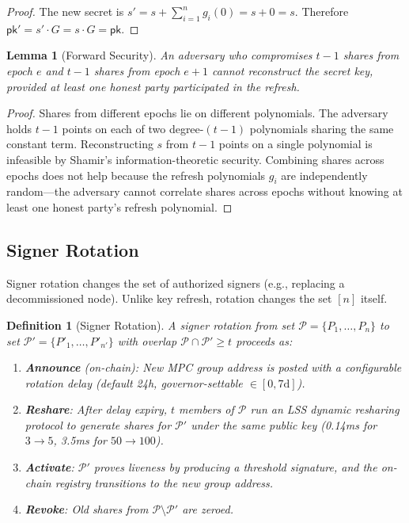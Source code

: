 \documentclass[11pt,twocolumn]{article}
\newtheorem{lemma}[theorem]{Lemma}
\newtheorem{definition}{Definition}[section]
\begin{document}
\begin{proof}
The new secret is $s' = s + \sum_{i=1}^n g_i(0) = s + 0 = s$. Therefore
$\mathsf{pk}' = s' \cdot G = s \cdot G = \mathsf{pk}$.
\end{proof}

\begin{lemma}[Forward Security]
\label{lem:forward-sec}
An adversary who compromises $t-1$ shares from epoch $e$ and $t-1$ shares from
epoch $e+1$ cannot reconstruct the secret key, provided at least one honest party
participated in the refresh.
\end{lemma}

\begin{proof}
Shares from different epochs lie on different polynomials. The adversary holds
$t-1$ points on each of two degree-$(t-1)$ polynomials sharing the same constant
term. Reconstructing $s$ from $t-1$ points on a single polynomial is infeasible
by Shamir's information-theoretic security. Combining shares across epochs does not
help because the refresh polynomials $g_i$ are independently random---the adversary
cannot correlate shares across epochs without knowing at least one honest party's
refresh polynomial.
\end{proof}

\subsection{Signer Rotation}
\label{sec:rotation}

Signer rotation changes the set of authorized signers (e.g., replacing a
decommissioned node). Unlike key refresh, rotation changes the set $[n]$ itself.

\begin{definition}[Signer Rotation]
A signer rotation from set $\mathcal{P} = \{P_1, \ldots, P_n\}$ to set
$\mathcal{P}' = \{P'_1, \ldots, P'_{n'}\}$ with overlap
$\mathcal{P} \cap \mathcal{P}' \geq t$ proceeds as:
\begin{enumerate}[nosep]
  \item \textbf{Announce} (on-chain): New MPC group address is posted with a
    configurable rotation delay (default 24h, governor-settable $\in [0, 7\text{d}]$).
  \item \textbf{Reshare}: After delay expiry, $t$ members of $\mathcal{P}$ run an LSS
    dynamic resharing protocol to generate shares for $\mathcal{P}'$ under the same
    public key (0.14ms for $3 \to 5$, 3.5ms for $50 \to 100$).
  \item \textbf{Activate}: $\mathcal{P}'$ proves liveness by producing a threshold
    signature, and the on-chain registry transitions to the new group address.
  \item \textbf{Revoke}: Old shares from $\mathcal{P} \setminus \mathcal{P}'$ are
    zeroed.
\end{enumerate}
\end{definition}
\end{document}

